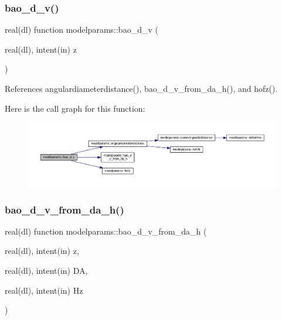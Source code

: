 \subsubsection{\texorpdfstring{bao\+\_\+d\+\_\+v()}{bao\_d\_v()}}
{\footnotesize\ttfamily real(dl) function modelparams\+::bao\+\_\+d\+\_\+v (\begin{DoxyParamCaption}\item[{real(dl), intent(in)}]{z }\end{DoxyParamCaption})}



References angulardiameterdistance(), bao\+\_\+d\+\_\+v\+\_\+from\+\_\+da\+\_\+h(), and hofz().

Here is the call graph for this function\+:
\nopagebreak
\begin{figure}[H]
\begin{center}
\leavevmode
\includegraphics[width=350pt]{namespacemodelparams_a39160c5bd9a51624f48cbef4197bb22f_cgraph}
\end{center}
\end{figure}
\mbox{\label{namespacemodelparams_a3a1026b2054f510f0c0dd9ee5c95e1b9}} 
\subsubsection{\texorpdfstring{bao\+\_\+d\+\_\+v\+\_\+from\+\_\+da\+\_\+h()}{bao\_d\_v\_from\_da\_h()}}
{\footnotesize\ttfamily real(dl) function modelparams\+::bao\+\_\+d\+\_\+v\+\_\+from\+\_\+da\+\_\+h (\begin{DoxyParamCaption}\item[{real(dl), intent(in)}]{z,  }\item[{real(dl), intent(in)}]{DA,  }\item[{real(dl), intent(in)}]{Hz }\end{DoxyParamCaption})}



